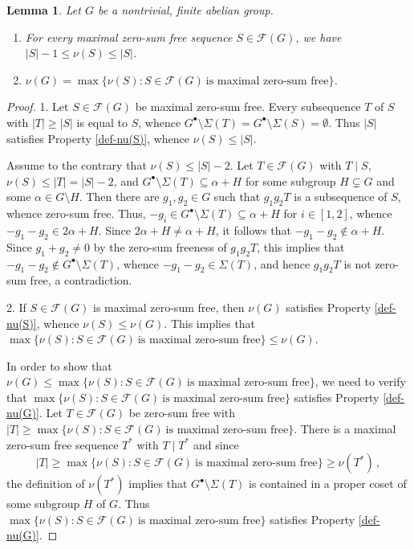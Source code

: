 \documentclass[a4paper, 10pt]{amsart}
\theoremstyle{plain}
\newtheorem{lemma}[theorem]{\bf Lemma}
\theoremstyle{definition}
\numberwithin{equation}{section}
\begin{document}
{\begin{lemma} \label{6.2}
Let $G$ be a nontrivial, finite abelian group.
\begin{enumerate}
\item For every maximal zero-sum free sequence $S \in \mathcal F (G)$, we have $|S|-1 \le \nu (S) \le |S|$.

\item $\nu (G) = \max \{ \nu (S) \colon S \in \mathcal F (G) \ \text{is maximal zero-sum free} \}$.
\end{enumerate}
\end{lemma}

\begin{proof}
1. Let $S \in \mathcal F (G)$ be maximal zero-sum free. Every subsequence $T$ of $S$ with $|T| \ge |S|$ is equal to $S$, whence $G^{\bullet} \setminus \Sigma (T)  = G^{\bullet} \setminus \Sigma (S) = \emptyset$. Thus $|S|$ satisfies Property  \eqref{def-nu(S)}, whence $\nu (S) \le |S|$. 

Assume to the contrary that $\nu (S) \le |S|-2$. Let $T \in \mathcal F (G)$ with $T \mid S$, $\nu (S) \le|T| = |S|-2$, and $G^{\bullet} \setminus \Sigma (T) \subseteq \alpha + H$ for some subgroup $H \subsetneq G$ and some $\alpha \in G \setminus H$. Then there are $g_1, g_2 \in G$ such that $g_1g_2T$ is a subsequence of $S$, whence zero-sum free. Thus, $-g_i \in G^{\bullet} \setminus \Sigma (T) \subseteq \alpha + H$ for $i \in [1,2]$, whence $-g_1-g_2 \in 2 \alpha + H$. Since $2 \alpha + H \ne \alpha + H$, it follows that $-g_1-g_2 \notin \alpha + H$. Since $g_1+g_2\ne0$ by the zero-sum freeness of $g_1g_2T$, this implies that $-g_1-g_2 \notin G^{\bullet}\setminus\Sigma(T)$, whence $-g_1-g_2\in\Sigma(T)$, and hence $g_1g_2T$ is not zero-sum free, a contradiction.

2. If $S \in \mathcal F (G)$ is maximal zero-sum free, then $\nu (G)$ satisfies Property \eqref{def-nu(S)}, whence $\nu (S) \le \nu (G)$. This implies that $\max \{ \nu (S) \colon S \in \mathcal F (G) \ \text{is maximal zero-sum free} \} \le \nu (G)$.

In order to show that $\nu (G) \le \max \{ \nu (S) \colon S \in \mathcal F (G) \ \text{is maximal zero-sum free} \}$, we need to verify that $\max \{ \nu (S) \colon S \in \mathcal F (G) \ \text{is maximal zero-sum free} \}$ satisfies Property \eqref{def-nu(G)}. Let $T \in \mathcal F (G)$ be zero-sum free with $|T| \ge \max \{ \nu (S) \colon S \in \mathcal F (G) \ \text{is maximal zero-sum free} \}$. There is a maximal zero-sum free sequence $T^*$ with $T \mid T^*$ and since
\[
|T| \ge \max \{ \nu (S) \colon S \in \mathcal F (G) \ \text{is maximal zero-sum free} \} \ge \nu (T^*) \,,
\]
the definition of $\nu (T^*)$ implies that $G^{\bullet} \setminus \Sigma (T)$ is contained in a proper coset of some subgroup $H$ of $G$. Thus $\max \{ \nu (S) \colon S \in \mathcal F (G) \ \text{is maximal zero-sum free} \}$ satisfies Property \eqref{def-nu(G)}.
\end{proof}
	

}
\end{document}
